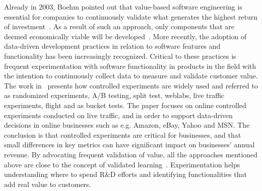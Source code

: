 \documentclass[12pt]{article}
\begin{document}
 Already in 2003, Boehm pointed out that value-based software
engineering is essential for companies to continuously validate
what generates the highest return of investment~\cite{Boehm2003}. 
As a
result of such an approach, only components that are deemed
economically viable will be developed~\cite{Biffl2005}.
More recently, the adoption of data-driven development practices
in relation to software features and functionality has been
increasingly recognized. Critical to these practices is frequent
experimentation with software functionality in products in the
field with the intention to continuously collect data to measure and validate customer value. 
The work in~\cite{Kohavi10} presents how controlled experiments are widely used and
referred to as randomized experiments, A/B testing, split test,
weblabs, live traffic experiments, flight and as bucket tests. %
The paper focuses on online controlled experiments
conducted on live traffic, and in order to support data-driven
decisions in online businesses such as e.g. Amazon, eBay, Yahoo
and MSN. The conclusion is that controlled experiments are critical
for businesses, and that small differences in key metrics can have
significant impact on businesses' annual revenue.
By advocating frequent validation of value, all the approaches
mentioned above are close to the concept of validated learning~\cite{LeanStartup11}. 
Experimentation helps
understanding where to spend R\&D efforts and identifying functionalities
that add real value to customers.
\end{document}

